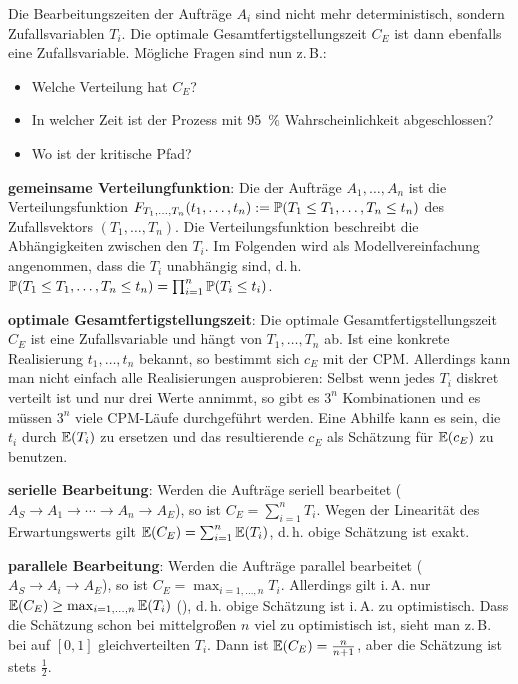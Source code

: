 Die Bearbeitungszeiten der Aufträge $A_i$ sind nicht mehr deterministisch, sondern
Zufallsvariablen $T_i$.
Die optimale Gesamtfertigstellungszeit $C_E$ ist dann ebenfalls eine Zufallsvariable.
Mögliche Fragen sind nun z.\,B.:
\begin{itemize}
    \item
    Welche Verteilung hat $C_E$?

    \item
    In welcher Zeit ist der Prozess mit \SI{95}{\percent} Wahrscheinlichkeit abgeschlossen?

    \item
    Wo ist der kritische Pfad?
\end{itemize}

\linie

\textbf{gemeinsame Verteilungfunktion}:
Die  der Aufträge $A_1, \dotsc, A_n$ ist
die Verteilungsfunktion
$F_{T_1,\dotsc,T_n}(t_1, \dotsc, t_n) := \mathbb{P}(T_1 \le T_1, \dotsc, T_n \le t_n)$
des Zufallsvektors $(T_1, \dotsc, T_n)$.
Die Verteilungsfunktion beschreibt die Abhängigkeiten zwischen den $T_i$.
Im Folgenden wird als Modellvereinfachung angenommen, dass die $T_i$ unabhängig sind, d.\,h.\\
$\mathbb{P}(T_1 \le T_1, \dotsc, T_n \le t_n) = \prod_{i=1}^n \mathbb{P}(T_i \le t_i)$.

\textbf{optimale Gesamtfertigstellungszeit}:
Die optimale Gesamtfertigstellungszeit $C_E$ ist eine Zufallsvariable und hängt von
$T_1, \dotsc, T_n$ ab.
Ist eine konkrete Realisierung $t_1, \dotsc, t_n$ bekannt, so bestimmt sich $c_E$ mit der CPM.
Allerdings kann man nicht einfach alle Realisierungen ausprobieren:
Selbst wenn jedes $T_i$ diskret verteilt ist und nur drei Werte annimmt, so gibt es
$3^n$ Kombinationen und es müssen $3^n$ viele CPM-Läufe durchgeführt werden.
Eine Abhilfe kann es sein, die $t_i$ durch $\mathbb{E}(T_i)$ zu ersetzen
und das resultierende $c_E$ als Schätzung für $\mathbb{E}(c_E)$ zu benutzen.

\linie

\textbf{serielle Bearbeitung}:
Werden die Aufträge seriell bearbeitet ($A_S \to A_1 \to \dotsb \to A_n \to A_E$),
so ist $C_E = \sum_{i=1}^n T_i$.
Wegen der Linearität des Erwartungswerts gilt
$\mathbb{E}(C_E) = \sum_{i=1}^n \mathbb{E}(T_i)$, d.\,h. obige Schätzung ist exakt.

\textbf{parallele Bearbeitung}:
Werden die Aufträge parallel bearbeitet ($A_S \to A_i \to A_E$),
so ist $C_E = \max_{i=1,\dotsc,n} T_i$.
Allerdings gilt i.\,A. nur $\mathbb{E}(C_E) \ge \max_{i=1,\dotsc,n} \mathbb{E}(T_i)$
(),
d.\,h. obige Schätzung ist i.\,A. zu optimistisch.
Dass die Schätzung schon bei mittelgroßen $n$ viel zu optimistisch ist, sieht man
z.\,B. bei auf $[0, 1]$ gleichverteilten $T_i$.
Dann ist $\mathbb{E}(C_E) = \frac{n}{n+1}$, aber die Schätzung ist stets $\frac{1}{2}$.

